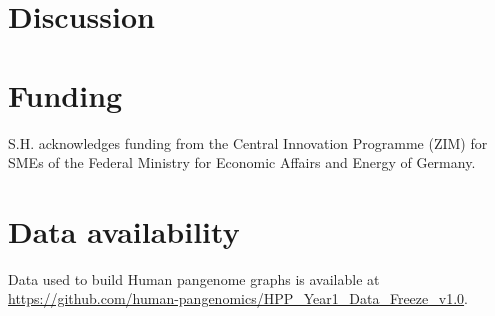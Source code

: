 \documentclass{bioinfo}
\begin{document}
\section{Discussion}



\section*{Funding}

S.H. acknowledges funding from the Central Innovation Programme (ZIM) for SMEs of the Federal Ministry for Economic Affairs and Energy of Germany.

\section*{Data availability}

Data used to build Human pangenome graphs is available at \url{https://github.com/human-pangenomics/HPP_Year1_Data_Freeze_v1.0}.


%
%
%
%
%
%
%











\end{document}
